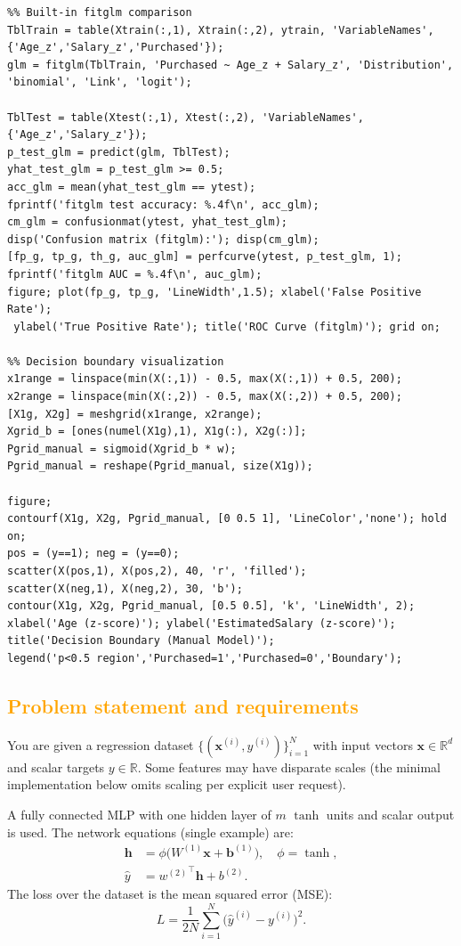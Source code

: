 \documentclass[11pt,a4paper]{article}
\begin{document}
\begin{lstlisting}
%% Built-in fitglm comparison
TblTrain = table(Xtrain(:,1), Xtrain(:,2), ytrain, 'VariableNames', {'Age_z','Salary_z','Purchased'});
glm = fitglm(TblTrain, 'Purchased ~ Age_z + Salary_z', 'Distribution', 'binomial', 'Link', 'logit');

TblTest = table(Xtest(:,1), Xtest(:,2), 'VariableNames', {'Age_z','Salary_z'});
p_test_glm = predict(glm, TblTest);
yhat_test_glm = p_test_glm >= 0.5;
acc_glm = mean(yhat_test_glm == ytest);
fprintf('fitglm test accuracy: %.4f\n', acc_glm);
cm_glm = confusionmat(ytest, yhat_test_glm);
disp('Confusion matrix (fitglm):'); disp(cm_glm);
[fp_g, tp_g, th_g, auc_glm] = perfcurve(ytest, p_test_glm, 1);
fprintf('fitglm AUC = %.4f\n', auc_glm);
figure; plot(fp_g, tp_g, 'LineWidth',1.5); xlabel('False Positive Rate');
 ylabel('True Positive Rate'); title('ROC Curve (fitglm)'); grid on;

%% Decision boundary visualization
x1range = linspace(min(X(:,1)) - 0.5, max(X(:,1)) + 0.5, 200);
x2range = linspace(min(X(:,2)) - 0.5, max(X(:,2)) + 0.5, 200);
[X1g, X2g] = meshgrid(x1range, x2range);
Xgrid_b = [ones(numel(X1g),1), X1g(:), X2g(:)];
Pgrid_manual = sigmoid(Xgrid_b * w);
Pgrid_manual = reshape(Pgrid_manual, size(X1g));

figure;
contourf(X1g, X2g, Pgrid_manual, [0 0.5 1], 'LineColor','none'); hold on;
pos = (y==1); neg = (y==0);
scatter(X(pos,1), X(pos,2), 40, 'r', 'filled');
scatter(X(neg,1), X(neg,2), 30, 'b');
contour(X1g, X2g, Pgrid_manual, [0.5 0.5], 'k', 'LineWidth', 2);
xlabel('Age (z-score)'); ylabel('EstimatedSalary (z-score)');
title('Decision Boundary (Manual Model)');
legend('p<0.5 region','Purchased=1','Purchased=0','Boundary');
\end{lstlisting}


\subsection{\textcolor{orange}{Problem statement and requirements}}
You are given a regression dataset \(\{(\mathbf{x}^{(i)}, y^{(i)})\}_{i=1}^N\) with input vectors \(\mathbf{x}\in\mathbb{R}^d\) and scalar targets \(y\in\mathbb{R}\). Some features may have disparate scales (the minimal implementation below omits scaling per explicit user request).

A fully connected MLP with one hidden layer of \(m\) \(\tanh\) units and scalar output is used. The network equations (single example) are:
\[
\begin{aligned}
\mathbf{h} &= \phi\!\big(W^{(1)}\mathbf{x} + \mathbf{b}^{(1)}\big), \quad \phi=\tanh,\\
\hat{y} &= {w^{(2)}}^\top \mathbf{h} + b^{(2)}.
\end{aligned}
\]
The loss over the dataset is the mean squared error (MSE):
\[
L = \frac{1}{2N}\sum_{i=1}^N \big(\hat y^{(i)} - y^{(i)}\big)^2.
\]
\end{document}
